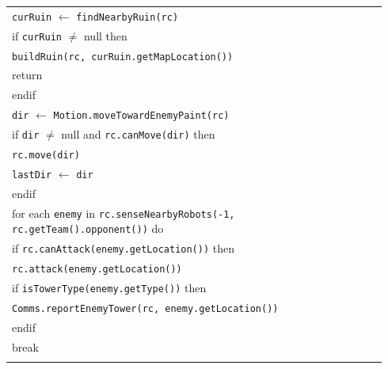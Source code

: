\documentclass{article}
\newenvironment{pseudobox}
{
\centering
\begin{longtable}{|p{0.94\linewidth}|}
\hline
}
{
\\ \hline
\end{longtable}
\vspace{0.05cm}
}
\begin{document}
\begin{enumerate}[label=\alph*.]
\begin{pseudobox}
\hspace*{1.5em}\texttt{curRuin} $\leftarrow$ \texttt{findNearbyRuin(rc)} \\

\hspace*{1.5em}if \texttt{curRuin} $\neq$ null then \\
\hspace*{3em}\texttt{buildRuin(rc, curRuin.getMapLocation())} \\
\hspace*{3em}return \\
\hspace*{1.5em}endif \\

\hspace*{1.5em}\texttt{dir} $\leftarrow$ \texttt{Motion.moveTowardEnemyPaint(rc)} \\

\hspace*{1.5em}if \texttt{dir} $\neq$ null and \texttt{rc.canMove(dir)} then \\
\hspace*{3em}\texttt{rc.move(dir)} \\
\hspace*{3em}\texttt{lastDir} $\leftarrow$ \texttt{dir} \\
\hspace*{1.5em}endif \\

\hspace*{1.5em}for each \texttt{enemy} in \texttt{rc.senseNearbyRobots(-1, rc.getTeam().opponent())} do \\

\hspace*{3em}if \texttt{rc.canAttack(enemy.getLocation())} then \\

\hspace*{4.5em}\texttt{rc.attack(enemy.getLocation())} \\

\hspace*{4.5em}if \texttt{isTowerType(enemy.getType())} then \\
\hspace*{6em}\texttt{Comms.reportEnemyTower(rc, enemy.getLocation())} \\
\hspace*{4.5em}endif \\

\hspace*{4.5em}break \\


\end{pseudobox}
\end{enumerate}
\end{document}
